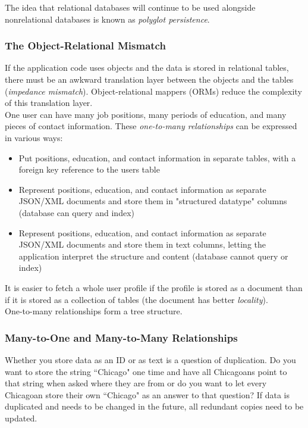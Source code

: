 \documentclass[12pt, titlepage]{article}
\begin{document}
The idea that relational databases will continue to be used alongside nonrelational databases is known as \textit{polyglot persistence}.

\subsubsection{The Object-Relational Mismatch}

If the application code uses objects and the data is stored in relational tables, there must be an awkward translation layer between the objects and the tables (\textit{impedance mismatch}). Object-relational mappers (ORMs) reduce the complexity of this translation layer. \\

One user can have many job positions, many periods of education, and many pieces of contact information. These \textit{one-to-many relationships} can be expressed in various ways:

\begin{itemize}
    \item Put positions, education, and contact information in separate tables, with a foreign key reference to the users table
    \item Represent positions, education, and contact information as separate JSON/XML documents and store them in "structured datatype" columns (database can query and index)
    \item Represent positions, education, and contact information as separate JSON/XML documents and store them in text columns, letting the application interpret the structure and content (database cannot query or index)
\end{itemize}

It is easier to fetch a whole user profile if the profile is stored as a document than if it is stored as a collection of tables (the document has better \textit{locality}). \\

One-to-many relationships form a tree structure.

\subsubsection{Many-to-One and Many-to-Many Relationships}

Whether you store data as an ID or as text is a question of duplication. Do you want to store the string ``Chicago" one time and have all Chicagoans point to that string when asked where they are from or do you want to let every Chicagoan store their own ``Chicago" as an answer to that question? If data is duplicated and needs to be changed in the future, all redundant copies need to be updated. \\
\end{document}
